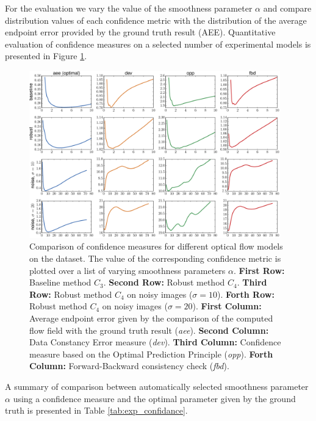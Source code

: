 For the evaluation we vary the value of the smoothness parameter $\alpha$ and compare distribution values of each confidence metric with the distribution of the average endpoint error provided by the ground truth result (AEE). Quantitative evaluation of confidence measures on a selected number of experimental models is presented in Figure \ref{fig:exp_confifance}. 


 \begin{figure}[ht]
  \centerline{
    \includegraphics[width=0.97\textwidth]{figures/exp_confidance.pdf} 
  }  
  \caption{Comparison of confidence measures for different optical flow models on the \rub dataset. The value of the corresponding confidence metric is plotted over a list of varying smoothness parameters $\alpha$.  \textbf{First Row:}  Baseline method $C_3$.  \textbf{Second Row:}  Robust method $C_4$.  \textbf{Third Row:} Robust method $C_4$ on noisy images ($\sigma = 10$).  \textbf{Forth Row:}  Robust method $C_4$ on noisy images ($\sigma = 20$). \textbf{First Column:} Average endpoint error given by the comparison of the computed flow field with the ground truth result (\textit{aee}). \textbf{Second Column:} Data Constancy Error measure (\textit{dev}). \textbf{Third Column:} Confidence measure based on the Optimal Prediction Principle (\textit{opp}). \textbf{Forth Column:} Forward-Backward consistency check (\textit{fbd}).}
  \label{fig:exp_confifance}
\end{figure} 

A summary of comparison between automatically selected smoothness parameter $\alpha$ using a confidence measure and the optimal parameter given by the ground truth is presented in Table \ref{tab:exp_confidance}.


